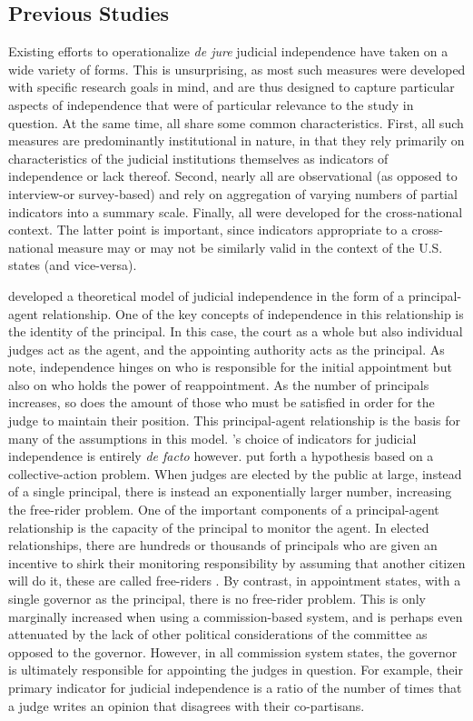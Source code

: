 \documentclass[12pt]{article}
\begin{document}
\subsection*{Previous Studies}%
Existing efforts to operationalize \textit{de jure} judicial independence have taken on a wide variety of forms. This is unsurprising, as most such measures were developed with specific research goals in mind, and are thus designed to capture particular aspects of independence that were of particular relevance to the study in question. At the same time, all share some common characteristics. First, all such measures are predominantly institutional in nature, in that they rely primarily on characteristics of the judicial institutions themselves as indicators of independence or lack thereof. Second, nearly all are observational (as opposed to interview-or survey-based) and rely on aggregation of varying numbers of partial indicators into a 
summary scale. Finally, all were developed for the cross-national context. The latter point is important, since indicators appropriate to a cross-national measure may or may not be similarly valid in the context of the U.S. states (and vice-versa).

\citet{Choi2010} developed a theoretical model of judicial independence in the form of a principal-agent relationship.  One of the key concepts of independence in this relationship is the identity of the principal.  In this case, the court as a whole but also individual judges act as the agent, and the appointing authority acts as the principal.  As \citeauthor{Choi2010} note, independence hinges on who is responsible for the initial appointment but also on who holds the power of reappointment.  As the number of principals increases, so does the amount of those who must be satisfied in order for the judge to maintain their position.  This principal-agent relationship is the basis for many of the assumptions in this model.  \citet{Choi2010}'s choice of indicators for judicial independence is entirely \textit{de facto} however.  \citet[296]{Choi2010} put forth a hypothesis based on a collective-action problem.  When judges are elected by the public at large, instead of a single principal, there is instead an exponentially larger number, increasing the free-rider problem.  One of the important components of a principal-agent relationship is the capacity of the principal to monitor the agent.  In elected relationships, there are hundreds or thousands of principals who are given an incentive to shirk their monitoring responsibility by assuming that another citizen will do it, these are called free-riders \citep{olson2009logic}.  By contrast, in appointment states, with a single governor as the principal, there is no free-rider problem.  This is only marginally increased when using a commission-based system, and is perhaps even attenuated by the lack of other political considerations of the committee as opposed to the governor.  However, in all commission system states, the governor is ultimately responsible for appointing the judges in question.  For example, their primary indicator for judicial independence is a ratio of the number of times that a judge writes an opinion that disagrees with their co-partisans.
\end{document}
